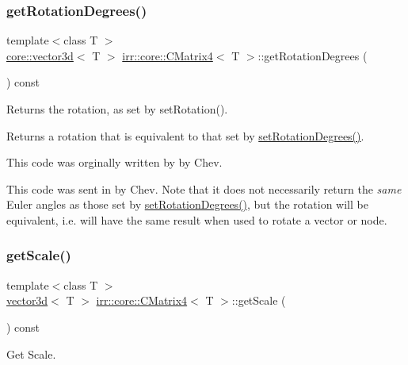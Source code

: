 \subsubsection{\texorpdfstring{get\+Rotation\+Degrees()}{getRotationDegrees()}}
{\footnotesize\ttfamily template$<$class T $>$ \\
\hyperlink{classirr_1_1core_1_1vector3d}{core\+::vector3d}$<$ T $>$ \hyperlink{classirr_1_1core_1_1CMatrix4}{irr\+::core\+::\+C\+Matrix4}$<$ T $>$\+::get\+Rotation\+Degrees (\begin{DoxyParamCaption}{ }\end{DoxyParamCaption}) const\hspace{0.3cm}{\ttfamily [inline]}}



Returns the rotation, as set by set\+Rotation(). 

Returns a rotation that is equivalent to that set by \hyperlink{classirr_1_1core_1_1CMatrix4_a8ee5ef8619d4b0f56d72ac84495ed644}{set\+Rotation\+Degrees()}.

This code was orginally written by by Chev.

This code was sent in by Chev. Note that it does not necessarily return the {\itshape same} Euler angles as those set by \hyperlink{classirr_1_1core_1_1CMatrix4_a8ee5ef8619d4b0f56d72ac84495ed644}{set\+Rotation\+Degrees()}, but the rotation will be equivalent, i.\+e. will have the same result when used to rotate a vector or node. \mbox{\label{classirr_1_1core_1_1CMatrix4_a27801e0cb2d3ce458f66ff7cfbe13544}} 
\subsubsection{\texorpdfstring{get\+Scale()}{getScale()}}
{\footnotesize\ttfamily template$<$class T $>$ \\
\hyperlink{classirr_1_1core_1_1vector3d}{vector3d}$<$ T $>$ \hyperlink{classirr_1_1core_1_1CMatrix4}{irr\+::core\+::\+C\+Matrix4}$<$ T $>$\+::get\+Scale (\begin{DoxyParamCaption}{ }\end{DoxyParamCaption}) const\hspace{0.3cm}{\ttfamily [inline]}}



Get Scale. 

